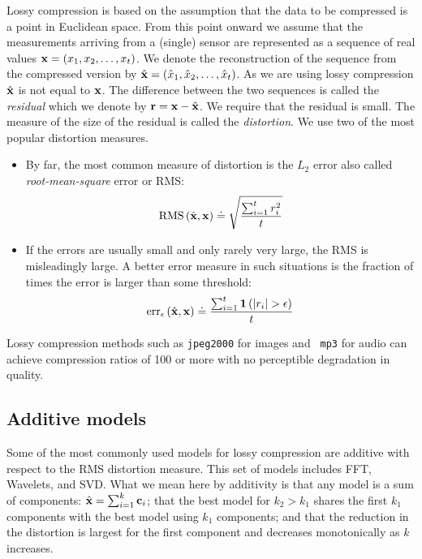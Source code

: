 Lossy compression is based on the assumption that the data to be
compressed is a point in Euclidean space. From this point onward we
assume that the measurements arriving from a (single) sensor are
represented as a sequence of real values $\mathbf{x}=(x_1,x_2,\ldots,x_t)$.
We denote the reconstruction of the sequence from the compressed
version by $\hat{\mathbf{x}}=(\hat{x}_1,\hat{x}_2,\ldots,\hat{x}_t)$. As we are using lossy
compression $\hat{\mathbf{x}}$ is not equal to $\mathbf{x}$. The difference between the
two sequences is called the {\em residual} which we denote by $\mathbf{r} =
\mathbf{x} -\hat{\mathbf{x}}$.  We require that the residual is small. 
The measure of
the size of the residual is called the {\em distortion}. We use two of
the most popular distortion measures.
\begin{itemize}
\item By far, the most common measure of distortion is the $L_2$ error
  also called {\em root-mean-square} error or RMS:
\[
\mbox{RMS}\left(\hat{\mathbf{x}},\mathbf{x} \right)
\doteq \sqrt{\frac{\sum_{i=1}^t r_i^2}{t}}
\]
\item If the errors are usually small and only rarely very large,
the RMS is misleadingly large. A better error measure in such
situations is the fraction of times the error is larger
than some threshold:
\[
\mbox{err}_{\epsilon}\left(\vhx,\vx \right)
\doteq \frac{\sum_{i=1}^t \mathbf{1}\left(|r_i|>\epsilon \right)}{t}
\]
\end{itemize}
Lossy compression methods such as {\tt jpeg2000} for images and {\tt
  mp3} for audio can achieve compression ratios of 100 or more
with no perceptible degradation in quality.

\subsection{Additive models}
\label{sec:additive}
Some of the most commonly used models for lossy compression are
additive with respect to the RMS distortion measure. This set of
models includes FFT, Wavelets, and SVD. What we mean here by
additivity is that any model is a sum of components: $\hat{\mathbf{x}} =
\sum_{i=1}^k \mathbf{c}_i$; that the best model for $k_2>k_1$ shares the
first $k_1$ components with the best model using $k_1$ components; and
that the reduction in the distortion is largest for the first component
and decreases monotonically as $k$ increases.

